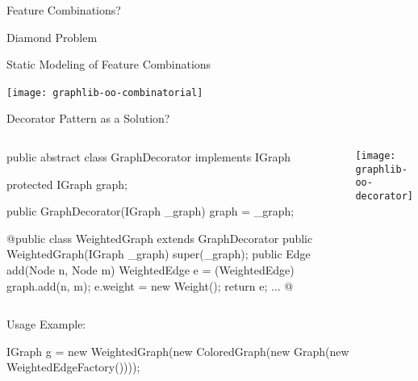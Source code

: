 \begin{frame}{Feature Combinations?} %
\end{frame}

\begin{frame}{Diamond Problem}
\end{frame}

\begin{frame}{Static Modeling of Feature Combinations}
	\begin{mycolumns}[columns=2,widths={70,30},animation=none]
		\texttt{[image: graphlib-oo-combinatorial]}
	\mynextcolumn
		~
	\end{mycolumns}
\end{frame}

\begin{frame}[fragile]{Decorator Pattern as a Solution?} %
		\begin{columns}
\begin{tiny}
\begin{codetight}{}
public abstract class GraphDecorator implements IGraph {
	protected IGraph graph;
	
	public GraphDecorator(IGraph _graph) { 
		graph = _graph; 
	}
}
\end{codetight}
\begin{codetight}{} %
@public class WeightedGraph extends GraphDecorator {
	public WeightedGraph(IGraph _graph) {
		super(_graph);
	}
	public Edge add(Node n, Node m) {
		WeightedEdge e = (WeightedEdge) graph.add(n, m);
		e.weight = new Weight();
		return e;
	}
	...
}@
\end{codetight}
\end{tiny}	
				\texttt{[image: graphlib-oo-decorator]}	
		\end{columns}
Usage Example: 
\begin{tiny}
\begin{codetight}{} %
IGraph g = new WeightedGraph(new ColoredGraph(new Graph(new WeightedEdgeFactory())));
\end{codetight}
\end{tiny}	
\end{frame}

